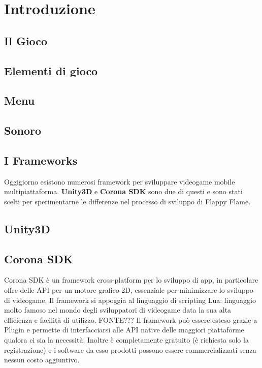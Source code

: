 \section{Introduzione}

	\subsection{Il Gioco}
			
			
		\subsection{Elementi di gioco}
		
		\subsection{Menu}
		
		\subsection{Sonoro}
	
	
	
\newpage
	
	\subsection{I Frameworks}
		Oggigiorno esistono numerosi framework per sviluppare videogame mobile multipiattaforma. \textbf{Unity3D} e \textbf{Corona SDK} sono due di questi e sono stati scelti per sperimentarne le differenze nel processo di sviluppo di Flappy Flame.
		
		\subsection{Unity3D}
		
		\subsection{Corona SDK}
			Corona SDK è un framework cross-platform per lo sviluppo di app, in particolare offre delle API per un motore grafico 2D, essenziale per minimizzare lo sviluppo di videogame. Il framework si appoggia al linguaggio di scripting Lua: linguaggio molto famoso nel mondo degli sviluppatori di videogame data la sua alta efficienza e facilità di utilizzo. FONTE??? Il framework può essere esteso grazie a Plugin e permette di interfacciarsi alle API native delle maggiori piattaforme qualora ci sia la necessità. Inoltre è completamente gratuito (è richiesta solo la registrazione) e i software da esso prodotti possono essere commercializzati senza nessun costo aggiuntivo.
		

